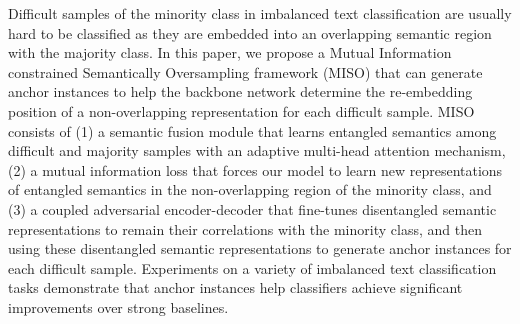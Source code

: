 Difficult samples of the minority class in imbalanced text classification are usually hard to be classified as they are embedded into an overlapping semantic region with the majority class. In this paper, we propose a Mutual Information constrained Semantically Oversampling framework (MISO) that can generate anchor instances to help the backbone network determine the re-embedding position of a non-overlapping representation for each difficult sample. MISO consists of (1) a semantic fusion module that learns entangled semantics among difficult and majority samples with an adaptive multi-head attention mechanism, (2) a mutual information loss that forces our model to learn new representations of entangled semantics in the non-overlapping region of the minority class, and (3) a coupled adversarial encoder-decoder that fine-tunes disentangled semantic representations to remain their correlations with the minority class, and then using these disentangled semantic representations to generate anchor instances for each difficult sample. Experiments on a variety of imbalanced text classification tasks demonstrate that anchor instances help classifiers achieve significant improvements over strong baselines.
